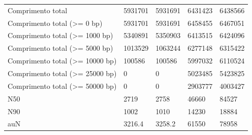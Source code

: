 \begin{table}[htb]
{\begin{tabular}{lllll}
		Comprimento total                            & 5931701                                & 5931691                                 & 6431423                           & 6438566                                                      \\
		Comprimento total (\textgreater{}= 0 bp)     & 5931701                                & 5931691                                 & 6458455                           & 6467051                                                      \\
		Comprimento total (\textgreater{}= 1000 bp)  & 5340891                                & 5350903                                 & 6413515                           & 6424096                                                    \\
		Comprimento total (\textgreater{}= 5000 bp)  & 1013529                                & 1063244                                 & 6277148                           & 6315422                                                      \\
		Comprimento total (\textgreater{}= 10000 bp) & 100586                                 & 100586                                  & 5997032                           & 6110524                                                       \\
		Comprimento total (\textgreater{}= 25000 bp) & 0                                      & 0                                       & 5023485                           & 5423825                                                  \\
		Comprimento total (\textgreater{}= 50000 bp) & 0                                      & 0                                       & 2903777                           & 4003427                                                              \\
		N50                                          & 2719                                   & 2758                                    & 46660                             & 84527                                            \\
		N90                                          & 1002                                   & 1010                                    & 14230                             & 18884                                                   \\
		auN                                          & 3216.4                                 & 3258.2                                  & 61550                             & 78958                                                  \\

\end{tabular}}
\end{table}
